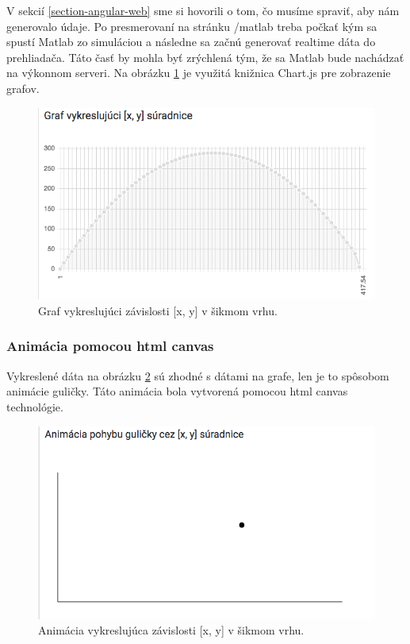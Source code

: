 V sekcií \ref{section-angular-web} sme si hovorili o tom, čo musíme spraviť, aby nám generovalo údaje. Po presmerovaní na stránku /matlab treba počkať kým sa spustí Matlab zo simuláciou a následne sa začnú generovať realtime dáta do prehliadača. Táto časť by mohla byť zrýchlená tým, že sa Matlab bude nachádzať na výkonnom serveri. Na obrázku \ref{img-angular-chartjs} je využitá knižnica Chart.js pre zobrazenie grafov.

\begin{figure}[H]
  \centering
  \includegraphics[scale=0.5]{img/code/angular-chartjs.png}
  \caption{Graf vykreslujúci závislosti [x, y] v šikmom vrhu.}
  \label{img-angular-chartjs}
\end{figure}

\subsubsection{Animácia pomocou html canvas}\label{section-canvas}
Vykreslené dáta na obrázku \ref{img-angular-canvas} sú zhodné s dátami na grafe, len je to spôsobom animácie guličky. Táto animácia bola vytvorená pomocou html canvas technológie.

\begin{figure}[H]
  \centering
  \includegraphics[scale=0.5]{img/code/angular-canvas.png}
  \caption{Animácia vykreslujúca závislosti [x, y] v šikmom vrhu.}
  \label{img-angular-canvas}
\end{figure}

